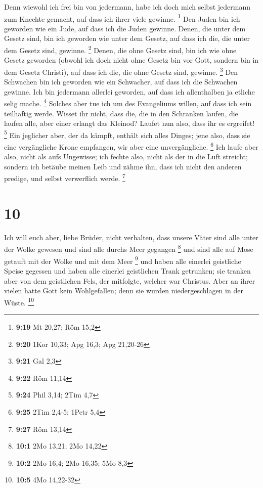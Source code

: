  Denn wiewohl ich frei bin von jedermann, habe ich doch
mich selbst jedermann zum Knechte gemacht, auf dass ich ihrer viele
gewinne. \footnote{\textbf{9:19} Mt 20,27; Röm 15,2}  Den
Juden bin ich geworden wie ein Jude, auf dass ich die Juden gewinne.
Denen, die unter dem Gesetz sind, bin ich geworden wie unter dem Gesetz,
auf dass ich die, die unter dem Gesetz sind, gewinne. \footnote{\textbf{9:20}
  1Kor 10,33; Apg 16,3; Apg 21,20-26}  Denen, die ohne
Gesetz sind, bin ich wie ohne Gesetz geworden (obwohl ich doch nicht
ohne Gesetz bin vor Gott, sondern bin in dem Gesetz Christi), auf dass
ich die, die ohne Gesetz sind, gewinne. \footnote{\textbf{9:21} Gal 2,3}
 Den Schwachen bin ich geworden wie ein Schwacher, auf dass
ich die Schwachen gewinne. Ich bin jedermann allerlei geworden, auf dass
ich allenthalben ja etliche selig mache. \footnote{\textbf{9:22} Röm
  11,14}  Solches aber tue ich um des Evangeliums willen,
auf dass ich sein teilhaftig werde.  Wisset ihr nicht, dass
die, die in den Schranken laufen, die laufen alle, aber einer erlangt
das Kleinod? Laufet nun also, dass ihr es ergreifet! \footnote{\textbf{9:24}
  Phil 3,14; 2Tim 4,7}  Ein jeglicher aber, der da kämpft,
enthält sich alles Dinges; jene also, dass sie eine vergängliche Krone
empfangen, wir aber eine unvergängliche. \footnote{\textbf{9:25} 2Tim
  2,4-5; 1Petr 5,4}  Ich laufe aber also, nicht als aufs
Ungewisse; ich fechte also, nicht als der in die Luft streicht;
 sondern ich betäube meinen Leib und zähme ihn, dass ich
nicht den anderen predige, und selbst verwerflich werde. \footnote{\textbf{9:27}
  Röm 13,14}

\hypertarget{section-5}{%
\section{10}\label{section-5}}

 Ich will euch aber, liebe Brüder, nicht verhalten, dass
unsere Väter sind alle unter der Wolke gewesen und sind alle durchs Meer
gegangen \footnote{\textbf{10:1} 2Mo 13,21; 2Mo 14,22}  und
sind alle auf Mose getauft mit der Wolke und mit dem Meer \footnote{\textbf{10:2}
  2Mo 16,4; 2Mo 16,35; 5Mo 8,3}  und haben alle einerlei
geistliche Speise gegessen  und haben alle einerlei
geistlichen Trank getrunken; sie tranken aber von dem geistlichen Fels,
der mitfolgte, welcher war Christus.  Aber an ihrer vielen
hatte Gott kein Wohlgefallen; denn sie wurden niedergeschlagen in der
Wüste. \footnote{\textbf{10:5} 4Mo 14,22-32}

